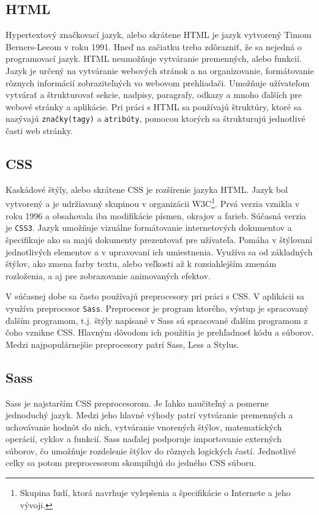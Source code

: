 \subsection{HTML}
Hypertextový značkovací jazyk\cite{html}, alebo skrátene HTML je jazyk vytvorený Timom Berners-Leeom v roku 1991. Hneď na začiatku treba zdôrazniť, že sa nejedná o programovací jazyk. HTML neumožňuje vytváranie premenných, alebo funkcií. Jazyk je určený na vytváranie webových stránok a na organizovanie, formátovanie rôznych informácií zobraziteľných vo webovom prehliadači. Umožňuje užívateľom vytvárať 
a štrukturovať sekcie, nadpisy, paragrafy, odkazy a mnoho ďalších pre webové stránky a aplikácie. Pri práci s HTML sa používajú štruktúry, ktoré sa nazývajú \texttt{značky(tagy)} a \texttt{atribúty}, pomocou ktorých sa štrukturujú jednotlivé časti web stránky. 

\subsection{CSS}
Kaskádové štýly\cite{css}, alebo skrátene CSS je rozšírenie jazyka HTML. Jazyk bol vytvorený a je udržiavaný skupinou v organizácii W3C\footnote{Skupina ľudí, ktorá navrhuje vylepšenia a špecifikácie o Internete a jeho vývoji.}.  Prvá verzia vznikla v roku 1996 a obsahovala iba modifikácie písmen, okrajov a farieb. Súčasná verzia je \texttt{CSS3}. Jazyk umožňuje vizuálne formátovanie internetových dokumentov a špecifikuje ako sa majú dokumenty prezentovať pre užívateľa. Pomáha v štýlovaní jednotlivých elementov a v upravovaní ich umiestnenia. Využíva sa od základných 
štýlov, ako zmena farby textu, alebo veľkosti až k rozsiahlejším zmenám rozloženia, a aj pre zobrazovanie animovaných efektov. 

V súčasnej dobe sa často používajú preprocesory pri práci s CSS. V aplikácii sa využíva preprocesor \texttt{Sass}. Preprocesor\cite{sass} je program ktorého, výstup je spracovaný ďalším programom, t.j. štýly napísané v Sass sú spracované ďalším programom z čoho vznikne CSS. Hlavným dôvodom ich použitia je prehľadnosť kódu a súborov. Medzi najpopulárnejšie preprocesory patrí Sass, Less a Stylus.

\subsection*{Sass}
\label{sass}
Sass\cite{sass} je najstarším CSS preprocesorom. Je ľahko naučiteľný a pomerne jednoduchý jazyk. Medzi jeho hlavné výhody patrí vytváranie premenných a uchovávanie hodnôt do nich, vytváranie vnorených štýlov, matematických operácií, cyklov a funkcií. Sass naďalej podporuje importovanie externých súborov, čo umožňuje rozdelenie štýlov do rôznych logických častí. Jednotlivé celky sa potom preprocesorom skompilujú do jedného CSS súboru. 

